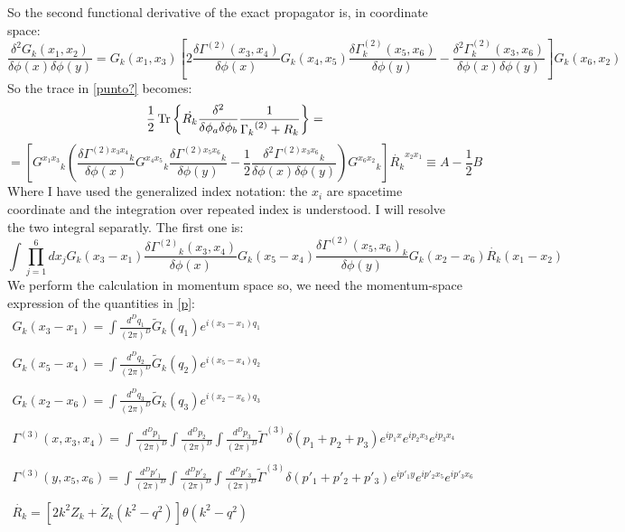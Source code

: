 So the second functional derivative of the exact propagator is, in coordinate space:
$$ \frac{\delta^2G_k(x_1, x_2)}{\delta \phi(x) \delta \phi(y)} = {G}_k(x_1,  x_3) \left[ 2\frac{\delta {\Gamma^{(2)}}(x_3, x_4)}{\delta \phi(x)}{G_k{(x_4, x_5)}} \frac{\delta {\Gamma_k^{(2)}}(x_5,  x_6)}{\delta \phi(y)} - \frac{\delta^2{\Gamma_k^{(2)}}(x_3, x_6)}{\delta \phi(x) \delta \phi(y)}\right] {G}_k({x_6, x_2})$$
So the trace in \eqref{punto?} becomes:
\begin{equation}
\frac{1}{2}\operatorname{Tr}\left\{ \dot{R_k}\frac{\delta^2 }{\delta\phi_a\delta\phi_b}\frac{1}{{\Gamma_k}^{(2)} + R_k}\right\} = 
\end{equation}
\begin{equation}
 = \left[ {G^{x_1 x_3}}_k \left(\frac{\delta {\Gamma^{(2)x_3 x_4}}_k}{\delta \phi(x)}{G^{x_4x_5}}_k \frac{\delta {\Gamma^{(2)x_5 x_6}}_k}{\delta \phi(y)} - \frac{1}{2}\frac{\delta^2{\Gamma^{(2)x_3x_6}}_k}{\delta \phi(x) \delta \phi(y)}\right) {G^{x_6x_2}}_k \right]{\dot{R_k}^{x_2 x_1}}\equiv A - \frac{1}{2}B
\end{equation}
Where I have used the generalized index notation: the $x_i$ are spacetime coordinate and the integration over repeated index is understood.
I will resolve the two integral separatly. The first one is:
\begin{equation}
\int \prod_{j=1}^6 dx_j G_k(x_3 - x_1) \frac{\delta {\Gamma^{(2)}}_k(x_3, x_4)}{\delta \phi(x)}{G_k(x_5 - x_4)} \frac{\delta {\Gamma^{(2)}(x_5, x_6)}_k}{\delta \phi(y)} G_k(x_2 - x_6)\dot{R_k}(x_1 - x_2) 
\end{equation}
We perform the calculation in momentum space so, we need the momentum-space expression of the quantities in \eqref{p}:
\begin{displaymath}
\left.
\begin{array}{l}
G_k (x_3-x_1) = \int \frac{d^Dq_1}{(2\pi)^D}  \widetilde{G}_k(q_1) e^{i(x_3-x_1)q_1}\\ \\
G_k (x_5-x_4) = \int \frac{d^Dq_2}{(2\pi)^D}  \widetilde{G}_k(q_2) e^{i(x_5-x_4)q_2}\\ \\
G_k (x_2-x_6) = \int \frac{d^Dq_3}{(2\pi)^D}  \widetilde{G}_k(q_3) e^{i(x_2-x_6)q_3}\\ \\
\Gamma^{(3)} (x, x_3, x_4) = \int \frac{d^Dp_1}{(2\pi)^D}\int \frac{d^Dp_2}{(2\pi)^D}\int \frac{d^Dp_3}{(2\pi)^D} \widetilde{\Gamma}^{(3)} \delta (p_1 + p_2 + p_3) e^{ip_1x}e^{ip_2x_3}e^{ip_3x_4}\\ \\	
\Gamma^{(3)} (y, x_5, x_6) = \int \frac{d^Dp'_1}{(2\pi)^D}\int \frac{d^Dp'_2}{(2\pi)^D}\int \frac{d^Dp'_3}{(2\pi)^D} \widetilde{\Gamma}^{(3)} \delta (p'_1 + p'_2 + p'_3) e^{ip'_1y}e^{ip'_2x_5}e^{ip'_3x_6}\\ \\
 \dot{R_k} = [2k^2 Z_k + \dot{Z}_k (k^2 - q^2)]\theta(k^2 - q^2)\\ \\
\end{array}
\right.
\end{displaymath}
